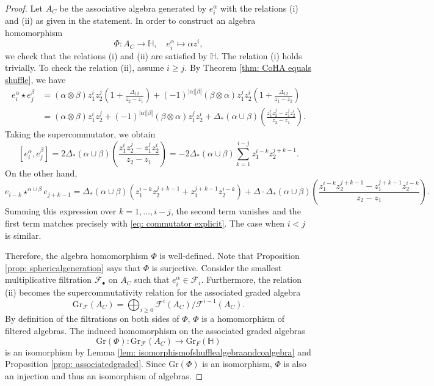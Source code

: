 \documentclass[10pt]{amsart}
\newcommand{\BH}{\mathbb{H}}
\newcommand{\CF}{\mathcal{F}}
\newcommand{\+}{{}^+}
\newcommand{\Gr}{\mathrm{Gr}}
\theoremstyle{definition}
\theoremstyle {definition}
\theoremstyle {definition}
\begin{document}
\begin{proof}
Let $A_C$ be the associative algebra generated by $e^{\alpha}_i$ with the relations (i) and (ii) as given in the statement. In order to construct an algebra homomorphism
\[ \Phi: A_C \rightarrow \BH,\quad e^\alpha_i\mapsto \alpha z^i,\] 
we check that the relations (i) and (ii) are satisfied by $\BH$. The relation (i) holds trivially. To check the relation (ii), assume $i \geq j$. By Theorem \ref{thm: CoHA equals shuffle}, we have
\begin{align*} e^{\alpha}_{i} \star e^{\beta}_j &= (\alpha \otimes \beta) z_1^i z_2^j \left(1+\frac{\Delta_{12}}{z_2-z_1} \right) + (-1)^{|\alpha||\beta|}(\beta \otimes \alpha) z_1^j z_2^i \left(1+\frac{\Delta_{12}}{z_1-z_2} \right)\\
&=(\alpha \otimes \beta) z_1^i z_2^j+(-1)^{|\alpha||\beta|}(\beta\otimes\alpha)z_1^jz_2^i+\Delta_*(\alpha\cup\beta)\left( \frac{z_1^iz_2^j-z_1^jz_2^i}{z_2-z_1}\right).
\end{align*}
Taking the supercommutator, we obtain
\begin{equation}\label{eq: commutator explicit}
    [e^{\alpha}_{i}, e^{\beta}_j]= 2 \Delta_*(\alpha\cup \beta) \left(\frac{z_1^iz_2^j-z_1^jz_2^i}{z_2-z_1} \right)=-2\Delta_*(\alpha\cup \beta)\sum_{k=1}^{i-j} z_1^{i-k} z_2^{j+k-1}.
\end{equation}
On the other hand, 
$$e_{i-k}\star^{\alpha\cup \beta}e_{j+k-1}=\Delta_*(\alpha\cup\beta)\left(z_1^{i-k}z_2^{j+k-1}+z_1^{j+k-1}z_2^{i-k}\right)+\Delta\cdot\Delta_*(\alpha\cup\beta)\left(\frac{z_1^{i-k}z_2^{j+k-1}-z_1^{j+k-1}z_2^{i-k}}{z_2-z_1}
\right).
$$
Summing this expression over $k=1, \dots, i-j$, the second term vanishes and the first term matches precisely with \eqref{eq: commutator explicit}. The case when $i<j$ is similar. 

Therefore, the algebra homomorphism $\Phi$ is well-defined. Note that Proposition \ref{prop: sphericalgeneration} says that $\Phi$ is surjective. Consider the smallest multiplicative filtration $\mathcal{F}_\bullet$ on $A_C$ such that $e^{\alpha}_i\in \CF_i$. Furthermore, the relation (ii) becomes the supercommutativity relation for the associated graded algebra 
\[ \mathrm{Gr}_{\mathcal{F}}(A_C) = \bigoplus_{i \geq 0} \mathcal{F}^{i}(A_C)/\mathcal{F}^{i-1}(A_C). \] 
By definition of the filtrations on both sides of $\Phi$, $\Phi$ is a homomorphism of filtered algebras. The induced homomorphism on the associated graded algebras
\[ \mathrm{Gr}(\Phi) \colon \mathrm{Gr}_{\mathcal{F}}(A_C) \rightarrow \mathrm{Gr}_F(\mathbb{H}) \]
is an isomorphism by Lemma \ref{lem: isomorphismofshufflealgebraandcoalgebra} and Proposition \ref{prop: associatedgraded}. Since $\Gr(\Phi)$ is an isomorphism, $\Phi$ is also an injection and thus an isomorphism of algebras. 
\end{proof}
\end{document}

